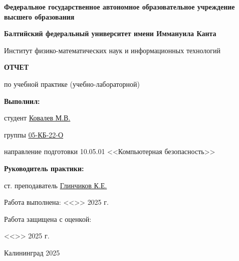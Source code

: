 \documentclass[12pt,a4paper]{article}
\begin{document}
\begin{titlepage}
    \centering
    {\large\textbf{Федеральное государственное автономное образовательное учреждение высшего образования}}\par
    \vspace{0.5cm}
    {\large\textbf{Балтийский федеральный университет имени Иммануила Канта}}\par
    \vspace{0.5cm}
    
    {\large Институт физико-математических наук и информационных технологий}\par
    \vspace{3cm}
    
    {\Large\textbf{ОТЧЕТ}}\par
    \vspace{1cm}
    
    {\Large по учебной практике (учебно-лабораторной)}\par
    \vspace{2cm}
    
    \begin{flushright}
        \large
        \textbf{Выполнил:}\par
        студент \underline{Ковалев М.В.}\par
        \vspace{0.5cm}
        группы \underline{05-КБ-22-О}\par
        \vspace{0.5cm}
        направление подготовки 10.05.01 <<Компьютерная безопасность>>\par
        \vspace{2cm}
        
        \textbf{Руководитель практики:}\par
        ст. преподаватель \underline{Глинчиков К.Е.}\par
        \vspace{2cm}
    \end{flushright}
    
    \begin{flushright}
        Работа выполнена:  <<\underline{\hspace{1cm}}>> \underline{\hspace{3cm}} 2025 г.\par
        \vspace{1cm}
        Работа защищена с оценкой: \underline{\hspace{6cm}}\par
        \vspace{1cm}
        <<\underline{\hspace{1cm}}>> \underline{\hspace{3cm}} 2025 г.\par
    \end{flushright}
    
    \vspace{2cm}
    {\large Калининград 2025}
\end{titlepage}
\end{document}
